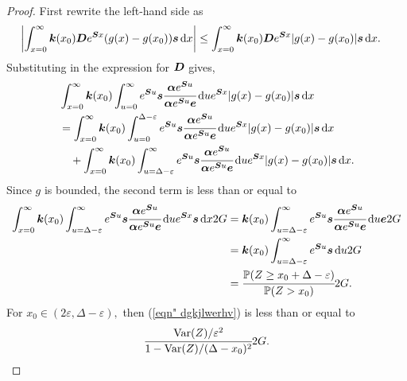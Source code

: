  \begin{proof}
 	First rewrite the left-hand side as 
 	\begin{align}
 		\left|\int_{x=0}^\infty \boldsymbol k(x_0)\boldsymbol De^{\boldsymbol Sx}(g(x)-g(x_0))\boldsymbol s\, \mathrm{d} x \right|
 		&\leq \int_{x=0}^\infty \boldsymbol k(x_0)\boldsymbol De^{\boldsymbol Sx}|g(x)-g(x_0)|\boldsymbol s\, \mathrm{d} x.
 	\end{align}
 	Substituting in the expression for \(\boldsymbol D\) gives,
 	\begin{align}
 		&\int_{x=0}^\infty \boldsymbol k(x_0)\int_{u=0}^\infty e^{\boldsymbol Su}\boldsymbol s \cfrac{\boldsymbol \alpha e^{\boldsymbol Su}}{\boldsymbol \alpha e^{\boldsymbol Su}\boldsymbol e} \, \mathrm{d} u e^{\boldsymbol Sx}|g(x)-g(x_0)|\boldsymbol s\, \mathrm{d} x  \nonumber 
 		\\&= \int_{x=0}^\infty \boldsymbol k(x_0)\int_{u=0}^{\Delta-\varepsilon} e^{\boldsymbol Su}\boldsymbol s \cfrac{\boldsymbol \alpha e^{\boldsymbol Su}}{\boldsymbol \alpha e^{\boldsymbol Su}\boldsymbol e} \, \mathrm{d} u e^{\boldsymbol Sx}|g(x)-g(x_0)|\boldsymbol s\, \mathrm{d} x \nonumber
 		\\&\quad {} + \int_{x=0}^\infty \boldsymbol k(x_0)\int_{u=\Delta-\varepsilon}^\infty e^{\boldsymbol Su}\boldsymbol s \cfrac{\boldsymbol \alpha e^{\boldsymbol Su}}{\boldsymbol \alpha e^{\boldsymbol Su}\boldsymbol e} \, \mathrm{d} u e^{\boldsymbol Sx}|g(x)-g(x_0)|\boldsymbol s\, \mathrm{d} x. \label{eqn: 2nd here}
 	\end{align}
 	Since \(g\) is bounded, the second term is less than or equal to 
 	\begin{align}
 		\int_{x=0}^\infty \boldsymbol k(x_0)\int_{u=\Delta-\varepsilon}^\infty e^{\boldsymbol Su}\boldsymbol s \cfrac{\boldsymbol \alpha e^{\boldsymbol Su}}{\boldsymbol \alpha e^{\boldsymbol Su}\boldsymbol e} \, \mathrm{d} u e^{\boldsymbol Sx}\boldsymbol s\, \mathrm{d} x 2G \nonumber
 		&= \boldsymbol k(x_0)\int_{u=\Delta-\varepsilon}^\infty e^{\boldsymbol Su}\boldsymbol s \cfrac{\boldsymbol \alpha e^{\boldsymbol Su}}{\boldsymbol \alpha e^{\boldsymbol Su}\boldsymbol e} \, \mathrm{d} u \boldsymbol e 2G \nonumber
 		\\&= \boldsymbol k(x_0)\int_{u=\Delta-\varepsilon}^\infty e^{\boldsymbol Su}\boldsymbol s \, \mathrm{d} u2G \nonumber
 		\\&= \cfrac{\mathbb P(Z\geq x_0+\Delta-\varepsilon)}{\mathbb P(Z>x_0)}2G. \label{eqn" dgkjlwerhv}
 	\end{align}
 	For \(x_0\in(2\varepsilon,\Delta-\varepsilon),\) then (\ref{eqn" dgkjlwerhv}) is less than or equal to 
 	\[\cfrac{\mathrm{Var}(Z)/\varepsilon^2}{1-\mathrm{Var}(Z)/(\Delta-x_0)^2}2G.\]
	

\end{proof}
